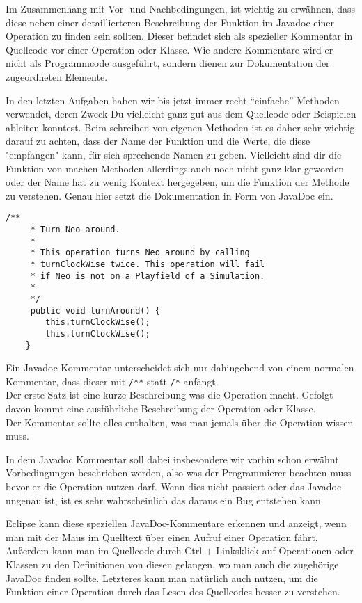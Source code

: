 \begin{Infobox}[Javadoc]
    Im Zusammenhang mit Vor- und Nachbedingungen, ist wichtig zu erwähnen, dass diese neben einer detaillierteren Beschreibung der Funktion im Javadoc einer Operation zu finden sein sollten.
    Dieser befindet sich als spezieller Kommentar in Quellcode vor einer Operation oder Klasse.
    Wie andere Kommentare wird er nicht als Programmcode ausgeführt, sondern dienen zur Dokumentation der zugeordneten Elemente.

    In den letzten Aufgaben haben wir bis jetzt immer recht \enquote{einfache} Methoden verwendet, deren Zweck Du vielleicht ganz gut aus dem Quellcode oder Beispielen ableiten konntest.
    Beim schreiben von eigenen Methoden ist es daher sehr wichtig darauf zu achten, dass der Name der Funktion und die Werte, die diese "empfangen" kann, für sich sprechende Namen zu geben.
    Vielleicht sind dir die Funktion von machen Methoden allerdings auch noch nicht ganz klar geworden oder der Name hat zu wenig Kontext hergegeben, um die Funktion der Methode
zu verstehen.
    Genau hier setzt die Dokumentation in Form von JavaDoc ein.

    \begin{lstlisting}[numbers=none]
    /**
     * Turn Neo around.
     *
     * This operation turns Neo around by calling
     * turnClockWise twice. This operation will fail 
     * if Neo is not on a Playfield of a Simulation.
     *
     */
     public void turnAround() {
        this.turnClockWise();
        this.turnClockWise();
    }
    \end{lstlisting}

    Ein Javadoc Kommentar unterscheidet sich nur dahingehend von einem normalen Kommentar, dass dieser mit \lstinline{/**} statt \lstinline{/*} anfängt.\\
    
    Der erste Satz ist eine kurze Beschreibung was die Operation macht.
    Gefolgt davon kommt eine ausführliche Beschreibung der Operation oder Klasse.\\

    Der Kommentar sollte alles enthalten, was man jemals über die Operation wissen muss.

    In dem Javadoc Kommentar soll dabei insbesondere wir vorhin schon erwähnt Vorbedingungen beschrieben werden, also was der Programmierer beachten muss bevor er die Operation nutzen darf.
    Wenn dies nicht passiert oder das Javadoc ungenau ist, ist es sehr wahrscheinlich das daraus ein Bug entstehen kann.

    Eclipse kann diese speziellen JavaDoc-Kommentare erkennen und anzeigt, wenn man mit der Maus im Quelltext über einen Aufruf einer Operation fährt.
    Außerdem kann man im Quellcode durch Ctrl + Linksklick auf Operationen oder Klassen zu den Definitionen von diesen gelangen, wo man auch die zugehörige JavaDoc finden sollte.
    Letzteres kann man natürlich auch nutzen, um die Funktion einer Operation durch das Lesen des Quellcodes besser zu verstehen.

\end{Infobox}

